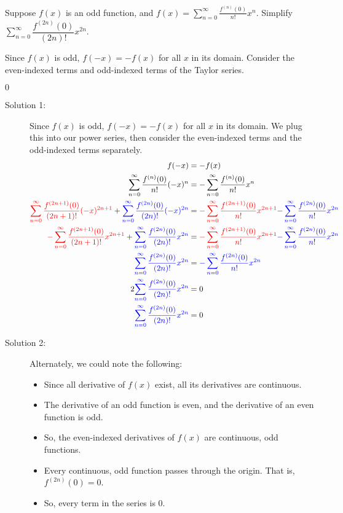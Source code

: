 \begin{Mquestion}
Suppose $f(x)$ is an odd function, and $f(x)=\displaystyle\sum_{n=0}^\infty\frac{f^{(n)}(0)}{n!}x^n$. Simplify
$\displaystyle\sum_{n=0}^\infty \dfrac{f^{(2n)}(0)}{(2n)!}x^{2n}$.
\end{Mquestion}
\begin{hint}
Since $f(x)$ is odd, $f(-x)=-f(x)$ for all $x$ in its domain. Consider the even-indexed terms and odd-indexed terms of the Taylor series.
\end{hint}
\begin{answer}
	$0$
\end{answer}
\begin{solution}
	\begin{description}
\item[Solution 1:]
		Since $f(x)$ is odd, $f(-x)=-f(x)$ for all $x$ in its domain. We plug this into our power series, then consider the even-indexed terms and the odd-indexed terms separately.
\begin{align*}
f(-x)&=-f(x)\\
\sum_{n=0}^\infty\frac{f^{(n)}(0)}{n!}(-x)^n&=-\sum_{n=0}^\infty\frac{f^{(n)}(0)}{n!}x^n\\
\textcolor{red}{\sum_{n=0}^\infty\frac{f^{(2n+1)}(0)}{(2n+1)!}(-x)^{2n+1}}+
\textcolor{blue}{\sum_{n=0}^\infty\frac{f^{(2n)}(0)}{(2n)!}(-x)^{2n}}&=\textcolor{red}{-\sum_{n=0}^\infty\frac{f^{(2n+1)}(0)}{n!}x^{2n+1}}\textcolor{blue}{-\sum_{n=0}^\infty\frac{f^{(2n)}(0)}{n!}x^{2n}}\\
\textcolor{red}{-\sum_{n=0}^\infty\frac{f^{(2n+1)}(0)}{(2n+1)!}x^{2n+1}}+
\textcolor{blue}{\sum_{n=0}^\infty\frac{f^{(2n)}(0)}{(2n)!}x^{2n}}&=\textcolor{red}{-\sum_{n=0}^\infty\frac{f^{(2n+1)}(0)}{n!}x^{2n+1}}\textcolor{blue}{-\sum_{n=0}^\infty\frac{f^{(2n)}(0)}{n!}x^{2n}}\\
\textcolor{blue}{\sum_{n=0}^\infty\frac{f^{(2n)}(0)}{(2n)!}x^{2n}}&=\textcolor{blue}{-\sum_{n=0}^\infty\frac{f^{(2n)}(0)}{n!}x^{2n}}\\
2\textcolor{blue}{\sum_{n=0}^\infty\frac{f^{(2n)}(0)}{(2n)!}x^{2n}}&=0\\
\textcolor{blue}{\sum_{n=0}^\infty\frac{f^{(2n)}(0)}{(2n)!}x^{2n}}&=0
\end{align*}

\item[Solution 2:]	Alternately, we could note the following:
	\begin{itemize}
	\item Since all derivative of $f(x)$ exist, all its derivatives are continuous.
		\item The derivative of an odd function is even, and the derivative of an even function is odd.
		\item So, the even-indexed derivatives of $f(x)$ are continuous, odd functions.
		\item Every continuous, odd function passes through the origin. That is, $f^{(2n)}(0)=0$.
		\item So, every term in the series is $0$.
		\end{itemize}
	\end{description}
\end{solution}
